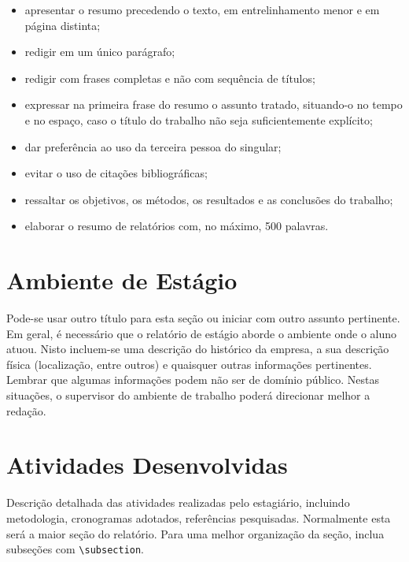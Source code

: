 \documentclass[a4paper, 12pt]{article}
\begin{document}
\begin{itemize}
\item apresentar o resumo precedendo o texto, em entrelinhamento menor e em página distinta;
\item redigir em um único parágrafo;
\item redigir com frases completas e não com sequência de títulos;
\item expressar na primeira frase do resumo o assunto tratado, situando-o no tempo e no espaço, caso o título do trabalho não seja suficientemente explícito;
\item dar preferência ao uso da terceira pessoa do singular;
\item evitar o uso de citações bibliográficas;
\item ressaltar os objetivos, os métodos, os resultados e as conclusões do trabalho;
\item elaborar o resumo de relatórios com, no máximo, 500 palavras.
\end{itemize}


\newpage
{}
\onehalfspacing

\section{Ambiente de Estágio}

Pode-se usar outro título para esta seção ou iniciar com outro assunto pertinente. Em geral, é necessário que o relatório de estágio aborde o ambiente onde o aluno atuou. Nisto incluem-se uma descrição do histórico da empresa, a sua descrição física (localização, entre outros) e quaisquer outras informações pertinentes. Lembrar que algumas informações podem não ser de domínio público. Nestas situações, o supervisor do ambiente de trabalho poderá direcionar melhor a redação.


\section{Atividades Desenvolvidas}

Descrição detalhada das atividades realizadas pelo estagiário, incluindo metodologia, cronogramas adotados, referências pesquisadas. Normalmente esta será a maior seção do relatório. Para uma melhor organização da seção, inclua subseções com 
\verb+\subsection+.
\end{document}
